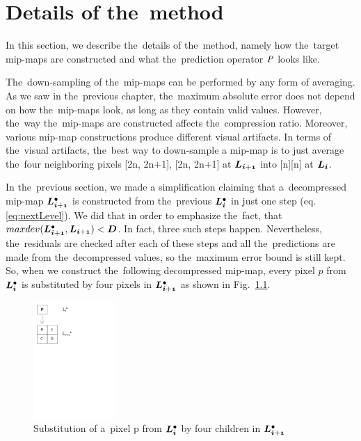 \chapter{Details of the~method}\label{chap:details}

In this section, we describe the~details of the~method, namely how the~target mip-maps are constructed and what the~prediction operator $\mathit{P_{}}$ looks like.

The~down-sampling of the~mip-maps can be performed by any form of averaging. As we saw in the~previous chapter, the~maximum absolute error does not depend on how the~mip-maps look, as long as they contain valid values. However, the~way the~mip-maps are constructed affects the~compression ratio. Moreover, various mip-map constructions produce different visual artifacts. In terms of the~visual artifacts, the~best way to down-sample a mip-map is to just average the~four neighboring pixels [2n, 2n+1], [2n, 2n+1] at $\lnorm{i+1}$ into [n][n] at $\lnorm{i}$.

In the~previous section, we made a simplification claiming that a~decompressed mip-map $\ldot{i+1}$ is constructed from the~previous $\ldot{i}$ in just one step (eq. \ref{eq:nextLevel}). We did that in order to emphasize the~fact, that $maxdev(\ldot{i+1}, \lnorm{i+1}) < \objnorm{D}{}$. In fact, three such steps happen. Nevertheless, the~residuals are checked after each of these steps and all the~predictions are made from the~decompressed values, so the~maximum error bound is still kept. So, when we construct the~following decompressed mip-map, every pixel $p$ from $\ldot{i}$ is substituted by four pixels in $\ldot{i+1}$ as shown in Fig.~\ref{fig:subst}. 

\begin{figure}
	\includegraphics[trim={0 19cm 11cm 0}, clip, width=0.28\textwidth]{figures/subst.pdf}\centering
	\caption{Substitution of a~pixel p from $\ldot{i}$ by four children in $\ldot{i+1}$}
	\label{fig:subst}
\end{figure}

